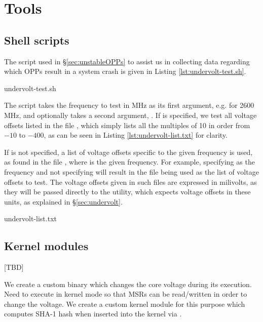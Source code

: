 \section{Tools}
\label{sec:tools}

\subsection{Shell scripts}
\label{sec:undervolt-test.sh}

The script used in §\ref{sec:unstableOPPs} to assist us in collecting data
regarding which OPPs result in a system crash is given in Listing
\ref{lst:undervolt-test.sh}.


    {undervolt-test.sh}

The script takes the frequency to test in MHz as its first argument, e.g.
 for 2600 MHz, and optionally takes a second argument, .
If  is specified, we test all voltage offsets listed in the file
, which simply lists all the multiples of 10 in order
from $-10$ to $-400$, as can be seen in Listing \ref{lst:undervolt-list.txt}
for clarity.

If  is not specified, a list of voltage offsets specific
to the given frequency is used, as found in the file
, where  is the given
frequency. For example, specifying  as the frequency and not
specifying  will result in the file 
being used as the list of voltage offsets to test. The voltage offsets given in
such files are expressed in milivolts, as they will be passed directly to the
 utility, which expects voltage offsets in these units, as
explained in §\ref{sec:undervolt}.


    {undervolt-list.txt}

\subsection{Kernel modules}

[TBD]

We create a custom  binary which changes the core voltage during its
execution.
Need to execute in kernel mode so that MSRs can be read/written in order to
change the voltage.
We create a custom kernel module for this purpose which computes SHA-1 hash
when inserted into the kernel via .

